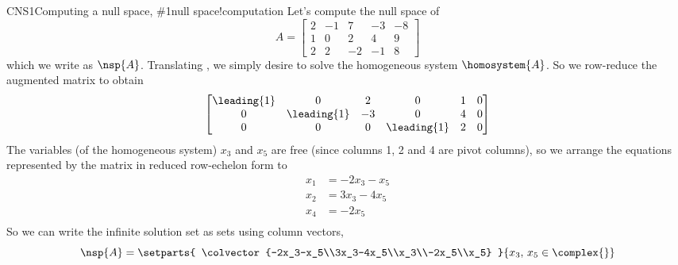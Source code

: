 \begin{example}{CNS1}{Computing a null space, \protect\#1}{null space!computation}
Let's compute the null space of
%
\begin{equation*}
A=\begin{bmatrix}
 2 & -1 & 7 & -3 & -8 \\
 1 & 0 & 2 & 4 & 9 \\
 2 & 2 & -2 & -1 & 8
\end{bmatrix}
\end{equation*}
%
which we write as $\nsp{A}$.   Translating , we simply desire to solve the homogeneous system $\homosystem{A}$.  So we row-reduce the augmented matrix to obtain
%
\begin{equation*}
\begin{bmatrix}
 \leading{1} & 0 & 2 & 0 & 1 & 0 \\
 0 & \leading{1} & -3 & 0 & 4 & 0 \\
 0 & 0 & 0 & \leading{1} & 2 & 0
\end{bmatrix}
\end{equation*}
%
The variables (of the homogeneous system) $x_3$ and $x_5$ are free (since columns 1, 2 and 4 are pivot columns), so we arrange the equations represented by the matrix in reduced row-echelon form to
%
\begin{align*}
x_1&=-2x_3-x_5\\
x_2&=3x_3-4x_5\\
x_4&=-2x_5\\
\end{align*}
%
So we can write the infinite solution set as sets using column vectors,
%
\begin{equation*}
\nsp{A}=\setparts{
\colvector{-2x_3-x_5\\3x_3-4x_5\\x_3\\-2x_5\\x_5}
}{
x_3,\,x_5\in\complex{\null}
}
\end{equation*}
%
\end{example}
%
